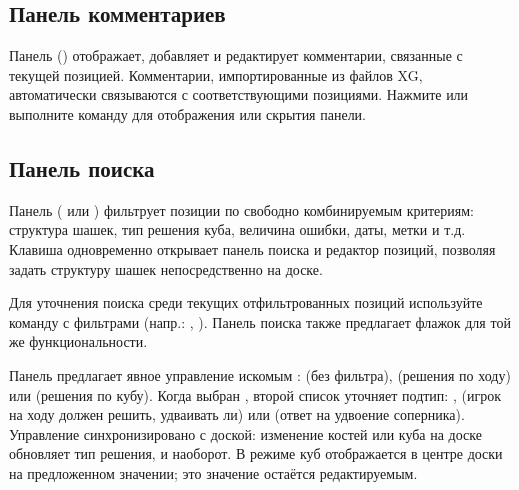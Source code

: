 \documentclass[letterpaper,10pt,russian]{sphinxmanual}
\begin{document}
\subsection{Панель комментариев}
\label{\detokenize{manuel:panneau-commentaires}}\label{\detokenize{manuel:id4}}
\sphinxAtStartPar
Панель  () отображает, добавляет и редактирует комментарии, связанные с текущей позицией. Комментарии, импортированные из файлов XG, автоматически связываются с соответствующими позициями. Нажмите  или выполните команду  для отображения или скрытия панели.


\subsection{Панель поиска}
\label{\detokenize{manuel:panneau-recherche}}\label{\detokenize{manuel:id5}}
\sphinxAtStartPar
Панель  ( или ) фильтрует позиции по свободно комбинируемым критериям: структура шашек, тип решения куба, величина ошибки, даты, метки и т.д. Клавиша  одновременно открывает панель поиска и редактор позиций, позволяя задать структуру шашек непосредственно на доске.

\sphinxAtStartPar
Для уточнения поиска среди текущих отфильтрованных позиций используйте команду  с фильтрами (напр.: , ). Панель поиска также предлагает флажок  для той же функциональности.

\sphinxAtStartPar
Панель предлагает явное управление искомым :  (без фильтра),  (решения по ходу) или  (решения по кубу). Когда выбран , второй список уточняет подтип: ,  (игрок на ходу должен решить, удваивать ли) или  (ответ на удвоение соперника). Управление синхронизировано с доской: изменение костей или куба на доске обновляет тип решения, и наоборот. В режиме  куб отображается в центре доски на предложенном значении; это значение остаётся редактируемым.
\end{document}
